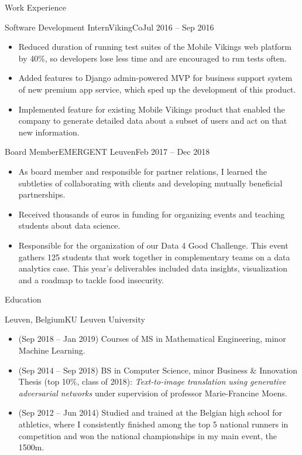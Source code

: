 \documentclass[]{mcdowellcv}
\begin{document}
\begin{cvsection}{Work Experience}
\begin{cvsubsection}{Software Development Intern}{VikingCo}{Jul 2016 -- Sep 2016}
\begin{itemize}
			\item Reduced duration of running test suites of the Mobile Vikings web platform by 40\%, so developers lose less time and are encouraged to run tests often.
			\item Added features to \textquotedbl{}Django admin\textquotedbl{}-powered MVP for business support system of new premium app service, which sped up the development of this product.
			\item Implemented feature for existing Mobile Vikings product that enabled the company to generate detailed data about a subset of users and act on that new information.
		\end{itemize}
	\end{cvsubsection}
	\begin{cvsubsection}{Board Member}{EMERGENT Leuven}{Feb 2017 -- Dec 2018}
		\begin{itemize}
			\item As board member and responsible for partner relations, I learned the subtleties of collaborating with clients and developing mutually beneficial partnerships. 
			\item Received thousands of euros in funding for organizing events and teaching students about data science.
			\item Responsible for the organization of our Data 4 Good Challenge. This event gathers 125 students that work together in complementary teams on a data analytics case. This year’s deliverables included data insights, visualization and a roadmap to tackle food insecurity.
		\end{itemize}
	\end{cvsubsection}
\end{cvsection}

\begin{cvsection}{Education}
	\begin{cvsubsection}{Leuven, Belgium}{KU Leuven University}{}
		\begin{itemize}
			\item (Sep 2018 -- Jan 2019) Courses of MS in Mathematical Engineering, minor Machine Learning.
			\item (Sep 2014 -- Sep 2018) BS in Computer Science, minor Business \& Innovation
			\\ Thesis (top 10\%, class of 2018): \emph{Text-to-image translation using generative adversarial networks} under supervision of professor Marie-Francine Moens.
			\item (Sep 2012 -- Jun 2014) Studied and trained at the Belgian high school for athletics, where I consistently finished among the top 5 national runners in competition and won the national championships in my main event, the 1500m.
		\end{itemize}
	\end{cvsubsection}
\end{cvsection}
\end{document}
